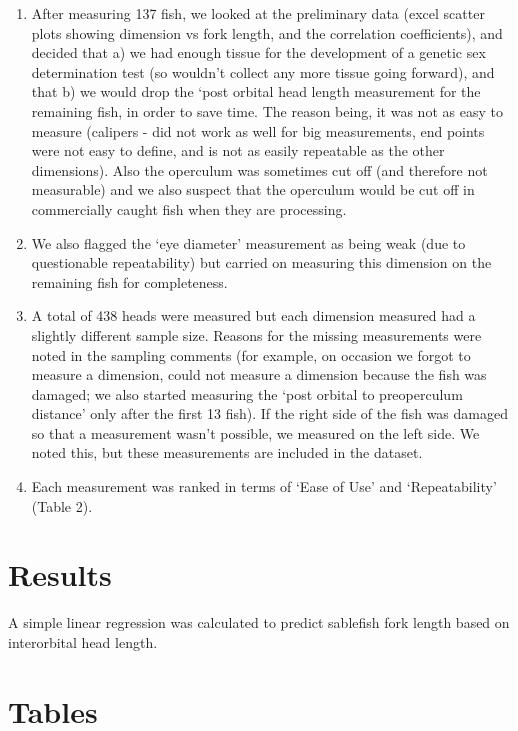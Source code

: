 \documentclass[12pt]{article}\usepackage[]{graphicx}\usepackage[]{color}
\begin{document}
\begin{enumerate}
\def\labelenumi{\arabic{enumi}.}
\setcounter{enumi}{4}
\item
  After measuring 137 fish, we looked at the preliminary data (excel scatter plots showing dimension vs fork length, and the correlation coefficients), and decided that a) we had enough tissue for the development of a genetic sex determination test (so wouldn't collect any more tissue going forward), and that b) we would drop the `post orbital head length measurement for the remaining fish, in order to save time. The reason being, it was not as easy to measure (calipers - did not work as well for big measurements, end points were not easy to define, and is not as easily repeatable as the other dimensions). Also the operculum was sometimes cut off (and therefore not measurable) and we also suspect that the operculum would be cut off in commercially caught fish when they are processing.
\item
  We also flagged the `eye diameter' measurement as being weak (due to questionable repeatability) but carried on measuring this dimension on the remaining fish for completeness.
\item
  A total of 438 heads were measured but each dimension measured had a slightly different sample size. Reasons for the missing measurements were noted in the sampling comments (for example, on occasion we forgot to measure a dimension, could not measure a dimension because the fish was damaged; we also started measuring the `post orbital to preoperculum distance' only after the first 13 fish). If the right side of the fish was damaged so that a measurement wasn't possible, we measured on the left side. We noted this, but these measurements are included in the dataset.
\item
  Each measurement was ranked in terms of `Ease of Use' and `Repeatability' (Table 2).
\end{enumerate}
\clearpage

\hypertarget{results}{%
\section{Results}\label{results}}

A simple linear regression was calculated to predict sablefish fork length based on interorbital head length.

\hypertarget{tables}{%
\section{Tables}\label{tables}}
\end{document}
